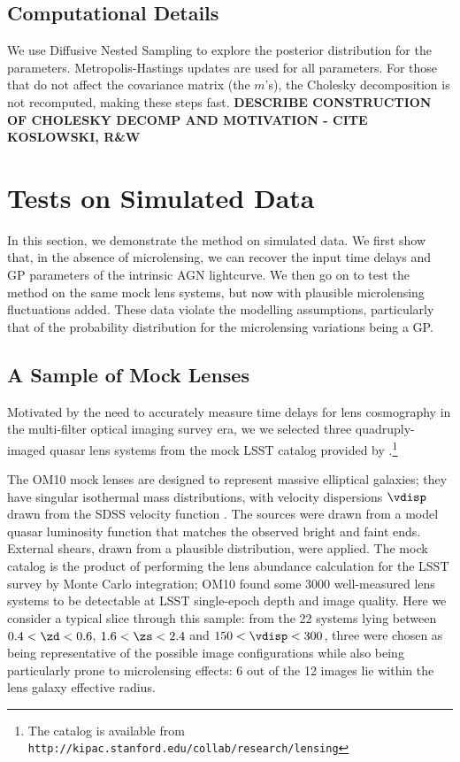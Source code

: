 \documentclass[useAMS,usenatbib, a4paper]{mn2e} \usepackage{natbib}
\begin{document}
\subsection{Computational Details}

We use Diffusive Nested Sampling \citep{dnest} to explore the posterior
distribution for the parameters. Metropolis-Hastings updates are used for all
parameters. For those that do not affect the covariance matrix (the $m$'s),
the Cholesky decomposition is not recomputed, making these steps fast. {\bf
DESCRIBE CONSTRUCTION OF CHOLESKY DECOMP AND MOTIVATION - CITE KOSLOWSKI,
R\&W}



\section{Tests on Simulated Data}\label{simdata}

In this section, we demonstrate the method on simulated data. We first show
that, in the absence of microlensing, we can recover the input time delays and
GP parameters of the intrinsic AGN lightcurve. We then go on to test the
method on the same mock lens systems, but now with plausible microlensing
fluctuations added. These data violate the modelling assumptions, particularly
that of the probability distribution for the microlensing variations being a
GP. 


\subsection{A Sample of Mock Lenses}

Motivated by the need to accurately measure time delays for lens cosmography
in the multi-filter optical imaging survey era, we  we selected three
quadruply-imaged quasar lens systems from the mock LSST  catalog provided by
\citet[][hereafter OM10]{OM10}.\footnote{The catalog is available from
\texttt{http://kipac.stanford.edu/collab/research/lensing}} 

The OM10 mock lenses are designed to represent massive elliptical galaxies;
they have singular isothermal mass distributions, with velocity dispersions
$\vdisp$ drawn from the SDSS velocity function \citep[extrapolated to higher
redshifts assuming no evolution, as in][]{Ogu++08}. The sources were drawn
from a model quasar luminosity function that matches the observed bright and
faint ends. External shears, drawn from a plausible distribution, were
applied. The mock catalog is the product of performing the lens abundance
calculation for the LSST survey by Monte Carlo integration; OM10 found some
3000 well-measured lens systems to be detectable at LSST single-epoch depth
and image quality. Here we consider a typical slice through this sample: from
the 22 systems lying between $0.4 < \zd < 0.6$, $1.6 < \zs < 2.4$ and $150 <
\vdisp < 300$\kms, three were chosen as being representative of the possible
image configurations while also being particularly prone to microlensing
effects: 6 out of the 12 images lie within the lens galaxy effective radius. 
\end{document}

